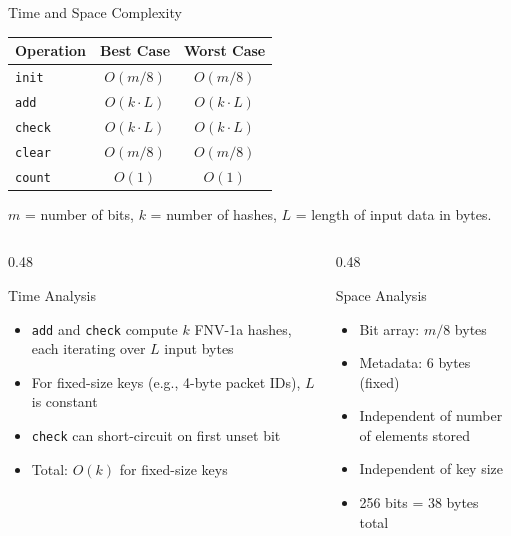 \documentclass[aspectratio=169, 10pt]{beamer}
\begin{document}
\begin{frame}{Time and Space Complexity}
\begin{table}
\centering
\begin{tabular}{@{}lcc@{}}
\toprule
\textbf{Operation} & \textbf{Best Case} & \textbf{Worst Case} \\
\midrule
\texttt{init}   & $O(m/8)$ & $O(m/8)$ \\
\texttt{add}    & $O(k \cdot L)$ & $O(k \cdot L)$ \\
\texttt{check}  & $O(k \cdot L)$ & $O(k \cdot L)$ \\
\texttt{clear}  & $O(m/8)$ & $O(m/8)$ \\
\texttt{count}  & $O(1)$ & $O(1)$ \\
\bottomrule
\end{tabular}
\end{table}

\vspace{0.3em}
{\scriptsize $m$ = number of bits, $k$ = number of hashes, $L$ = length of input data in bytes.}

\vspace{0.5em}
\begin{columns}[T]
\begin{column}{0.48\textwidth}
\begin{block}{Time Analysis}
\begin{itemize}
  \item \texttt{add} and \texttt{check} compute $k$ FNV-1a hashes,
        each iterating over $L$ input bytes
  \item For fixed-size keys (e.g., 4-byte packet IDs), $L$ is constant
  \item \texttt{check} can short-circuit on first unset bit
  \item Total: $O(k)$ for fixed-size keys
\end{itemize}
\end{block}
\end{column}

\begin{column}{0.48\textwidth}
\begin{block}{Space Analysis}
\begin{itemize}
  \item Bit array: $m/8$ bytes
  \item Metadata: 6 bytes (fixed)
  \item Independent of number of elements stored
  \item Independent of key size
  \item 256 bits = 38 bytes total
\end{itemize}
\end{block}
\end{column}
\end{columns}
\end{frame}
\end{document}
